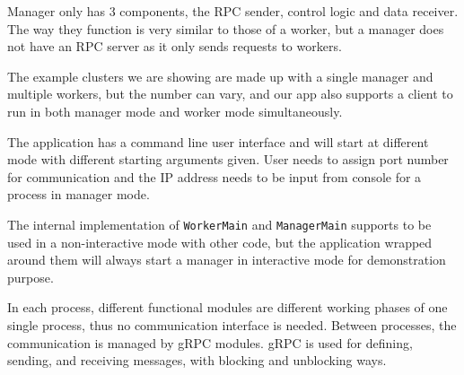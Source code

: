 Manager only has 3 components, the RPC sender, control logic and data receiver. The way they function is very similar to those of a worker, but a manager does not have an RPC server as it only sends requests to workers.

The example clusters we are showing are made up with a single manager and multiple workers, but the number can vary, and our app also supports a client to run in both manager mode and worker mode simultaneously.

The application has a command line user interface and will start at different mode with different starting arguments given. User needs to assign port number for communication and the IP address needs to be input from console for a process in manager mode.

The internal implementation of \texttt{WorkerMain} and \texttt{ManagerMain} supports to be used in a non-interactive mode with other code, but the application wrapped around them will always start a manager in interactive mode for demonstration purpose.

In each process, different functional modules are different working phases of one single process, thus no communication interface is needed. Between processes, the communication is managed by gRPC modules. gRPC is used for defining, sending, and receiving messages, with blocking and unblocking ways.
